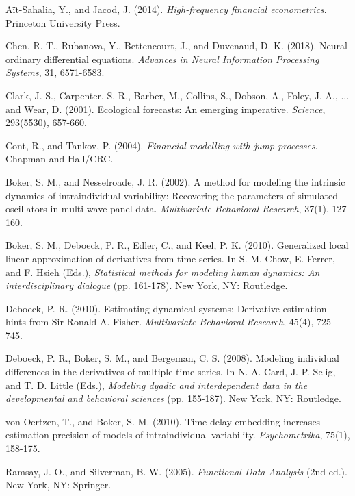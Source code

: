 \documentclass{article}
\begin{document}
\begin{thebibliography}{99}

 A\"it-Sahalia, Y., and Jacod, J. (2014). \textit{High-frequency financial econometrics}. Princeton University Press.

 Chen, R. T., Rubanova, Y., Bettencourt, J., and Duvenaud, D. K. (2018). Neural ordinary differential equations. \textit{Advances in Neural Information Processing Systems}, 31, 6571-6583.



 Clark, J. S., Carpenter, S. R., Barber, M., Collins, S., Dobson, A., Foley, J. A., ... and Wear, D. (2001). Ecological forecasts: An emerging imperative. \textit{Science}, 293(5530), 657-660.

 Cont, R., and Tankov, P. (2004). \textit{Financial modelling with jump processes}. Chapman and Hall/CRC.

 Boker, S. M., and Nesselroade, J. R. (2002). A method for modeling the intrinsic dynamics of intraindividual variability: Recovering the parameters of simulated oscillators in multi-wave panel data. \textit{Multivariate Behavioral Research}, 37(1), 127-160.

 Boker, S. M., Deboeck, P. R., Edler, C., and Keel, P. K. (2010). Generalized local linear approximation of derivatives from time series. In S. M. Chow, E. Ferrer, and F. Hsieh (Eds.), \textit{Statistical methods for modeling human dynamics: An interdisciplinary dialogue} (pp. 161-178). New York, NY: Routledge.

 Deboeck, P. R. (2010). Estimating dynamical systems: Derivative estimation hints from Sir Ronald A. Fisher. \textit{Multivariate Behavioral Research}, 45(4), 725-745.

 Deboeck, P. R., Boker, S. M., and Bergeman, C. S. (2008). Modeling individual differences in the derivatives of multiple time series. In N. A. Card, J. P. Selig, and T. D. Little (Eds.), \textit{Modeling dyadic and interdependent data in the developmental and behavioral sciences} (pp. 155-187). New York, NY: Routledge.

 von Oertzen, T., and Boker, S. M. (2010). Time delay embedding increases estimation precision of models of intraindividual variability. \textit{Psychometrika}, 75(1), 158-175.

 Ramsay, J. O., and Silverman, B. W. (2005). \textit{Functional Data Analysis} (2nd ed.). New York, NY: Springer.


\end{thebibliography}
\end{document}
